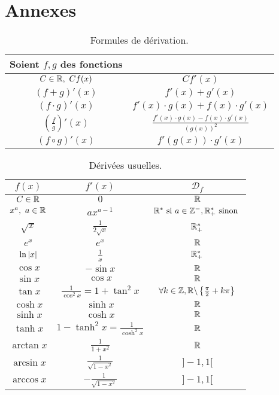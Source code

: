 \part{Annexes}
\def\arraystretch{1.5}
\begin{table}[!h]
    \centering
    \begin{tabular}{cc}
        \toprule
        Soient $f, g$ des fonctions \\
        \midrule
        $C \in \mathbb{R},\ C f(x)$ & $C f'(x)$  \\
        $(f + g)'(x)$ & $f'(x) + g'(x)$ \\
        $(f \cdot g)'(x)$ & $f'(x) \cdot g(x) + f(x) \cdot g'(x)$ \\
        $\left( \frac{f}{g} \right)'(x)$ & $\frac{f'(x) \cdot g(x) - f(x) \cdot g'(x)}{(g(x))^2}$ \\
        $(f \circ g)'(x)$ & $f'(g(x)) \cdot g'(x) $ \\
        \bottomrule
    \end{tabular}
    \caption{Formules de dérivation.}
    \label{tab:formules_derivation}
\end{table}

\begin{table}[!h]
    \centering
    \begin{tabular}{ccc}
        \toprule
        $f(x)$ & $f'(x)$ & $\mathcal{D}_f$ \\ 
        \midrule
        $C \in \mathbb{R}$ & $0$ & $\mathbb{R}$ \\
        $x^a,\ a \in \mathbb{R}$ & $a x^{a - 1}$ & $\mathbb{R}^* \text{ si } a \in \mathbb{Z}^-, \mathbb{R}_+^* \text{ sinon }$ \\
        $\sqrt{x}$ & $\frac{1}{2\sqrt{x}}$ & $\mathbb{R}_+^*$ \\
        $e^x$ & $e^x$ & $\mathbb{R}$ \\
        $\ln{\abs{x}}$ & $\frac{1}{x}$ & $\mathbb{R}_+^*$ \\
        $\cos{x}$ & $-\sin{x}$ & $\mathbb{R}$ \\
        $\sin{x}$ & $\cos{x}$ & $\mathbb{R}$ \\
        $\tan{x}$ & $\frac{1}{\cos^2{x}} = 1 + \tan^2{x}$ & $\forall k \in \mathbb{Z}, \mathbb{R} \backslash \left\{ \frac{\pi}{2} + k \pi \right\}$ \\
        $\cosh{x}$ & $\sinh{x}$ & $\mathbb{R}$ \\
        $\sinh{x}$ & $\cosh{x}$ & $\mathbb{R}$ \\
        $\tanh{x}$ & $1 - \tanh^2{x} = \frac{1}{\cosh^2{x}}$ & $\mathbb{R}$ \\
        $\arctan{x}$ & $\frac{1}{1 + x^2}$ & $\mathbb{R}$ \\
        $\arcsin{x}$ & $\frac{1}{\sqrt{1 - x^2}}$ & $]-1, 1[$ \\
        $\arccos{x}$ & $-\frac{1}{\sqrt{1 - x^2}}$ & $]-1, 1[$ \\
        \bottomrule
    \end{tabular}
    \caption{Dérivées usuelles.}
    \label{tab:derivees_usuelles}
\end{table}

